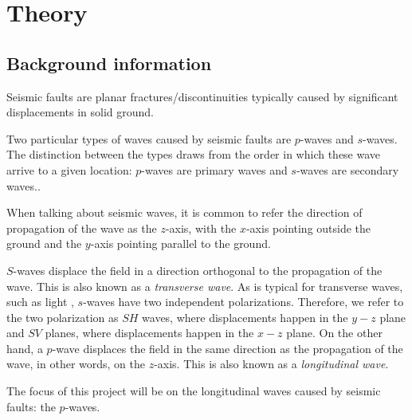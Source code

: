 \chapter{Theory}
\section{Background information}
Seismic faults are planar fractures/discontinuities typically caused by significant displacements in solid ground.

Two particular types of waves caused by seismic faults are $p$-waves and $s$-waves. The distinction between the types draws from the order in which these wave arrive to a given location: $p$-waves are primary waves and $s$-waves are secondary waves.\cite[57]{stein2009introduction}.

When talking about seismic waves, it is common to refer the direction of propagation of the wave as the $z$-axis, with the $x$-axis pointing outside the ground and the $y$-axis pointing parallel to the ground.

$S$-waves displace the field in a direction orthogonal to the propagation of the wave. This is also known as a \textit{transverse wave}. As is typical for transverse waves, such as light \cite{stein2009introduction}, $s$-waves have two independent polarizations. Therefore, we refer to the two polarization as $SH$ waves, where displacements happen in the $y-z$ plane and $SV$ planes, where displacements happen in the $x-z$ plane. 
On the other hand, a $p$-wave displaces the field in the same direction as the propagation of the wave, in other words, on the $z$-axis. This is also known as a \textit{longitudinal wave}\cite[57]{stein2009introduction}.

The focus of this project will be on the longitudinal waves caused by seismic faults: the $p$-waves.




